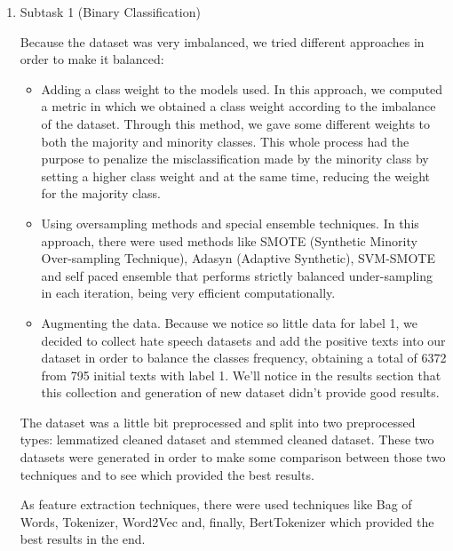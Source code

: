 \documentclass[11pt]{article}
\begin{document}
\begin{enumerate}

	\item Subtask 1 (Binary Classification)

	      Because the dataset was very imbalanced, we tried different approaches in
	      order to make it balanced:

	      \begin{itemize}
		      \item Adding a class weight to the models used. In this approach, we
		            computed a metric in which we obtained a class weight according to the
		            imbalance of the dataset. Through this method, we gave some different
		            weights to both the majority and minority classes. This whole process had
		            the purpose to penalize the misclassification made by the minority class by
		            setting a higher class weight and at the same time, reducing the weight for
		            the majority class.

		      \item Using oversampling methods and special ensemble techniques. In this
		            approach, there were used methods like SMOTE (Synthetic Minority
		            Over-sampling Technique), Adasyn (Adaptive Synthetic), SVM-SMOTE and self
		            paced ensemble that performs strictly balanced under-sampling in each
		            iteration, being very efficient computationally.

		      \item Augmenting the data. Because we notice so little data for label 1, we
		            decided to collect hate speech datasets and add the positive texts into our
		            dataset in order to balance the classes frequency, obtaining a total of 6372
		            from 795 initial texts with label 1. We'll notice in the results section
		            that this collection and generation of new dataset didn't provide good
		            results.
	      \end{itemize}

	      The dataset was a little bit preprocessed and split into two preprocessed
	      types: lemmatized cleaned dataset and stemmed cleaned dataset. These two
	      datasets were generated in order to make some comparison between those two
	      techniques and to see which provided the best results.

	      As feature extraction techniques, there were used techniques like Bag of
	      Words, Tokenizer, Word2Vec and, finally, BertTokenizer which provided the
	      best results in the end.


\end{enumerate}
\end{document}
